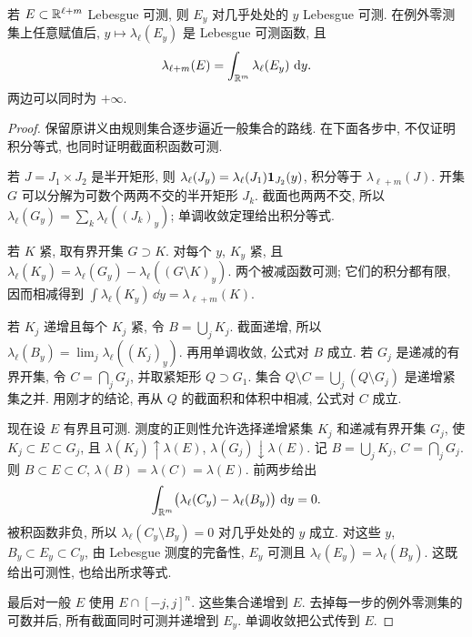 \begin{lemma}[集合的截面积公式]\label{ra:c6:cavalieri}
若 $E\subset\mathbb R^{\ell+m}$ Lebesgue 可测, 则 $E_y$ 对几乎处处的 $y$ Lebesgue 可测. 在例外零测集上任意赋值后, $y\mapsto\lambda_\ell(E_y)$ 是 Lebesgue 可测函数, 且
\[
 \lambda_{\ell+m}(E)=\int_{\mathbb R^m}\lambda_\ell(E_y)\,\,\mathrm d y.
\]
两边可以同时为 $+\infty$.
\end{lemma}
\begin{proof}
保留原讲义由规则集合逐步逼近一般集合的路线. 在下面各步中, 不仅证明积分等式, 也同时证明截面积函数可测.

若 $J=J_1\times J_2$ 是半开矩形, 则 $\lambda_\ell(J_y)=\lambda_\ell(J_1)\mathbf 1_{J_2}(y)$, 积分等于 $\lambda_{\ell+m}(J)$. 开集 $G$ 可以分解为可数个两两不交的半开矩形 $J_k$. 截面也两两不交, 所以 $\lambda_\ell(G_y)=\sum_k\lambda_\ell((J_k)_y)$; 单调收敛定理给出积分等式.

若 $K$ 紧, 取有界开集 $G\supset K$. 对每个 $y$, $K_y$ 紧, 且 $\lambda_\ell(K_y)=\lambda_\ell(G_y)-\lambda_\ell((G\setminus K)_y)$. 两个被减函数可测; 它们的积分都有限, 因而相减得到 $\int\lambda_\ell(K_y)\,\dd y=\lambda_{\ell+m}(K)$.

若 $K_j$ 递增且每个 $K_j$ 紧, 令 $B=\bigcup_jK_j$. 截面递增, 所以 $\lambda_\ell(B_y)=\lim_j\lambda_\ell((K_j)_y)$. 再用单调收敛, 公式对 $B$ 成立. 若 $G_j$ 是递减的有界开集, 令 $C=\bigcap_jG_j$, 并取紧矩形 $Q\supset G_1$. 集合 $Q\setminus C=\bigcup_j(Q\setminus G_j)$ 是递增紧集之并. 用刚才的结论, 再从 $Q$ 的截面积和体积中相减, 公式对 $C$ 成立.

现在设 $E$ 有界且可测. 测度的正则性允许选择递增紧集 $K_j$ 和递减有界开集 $G_j$, 使 $K_j\subset E\subset G_j$, 且 $\lambda(K_j)\uparrow\lambda(E)$, $\lambda(G_j)\downarrow\lambda(E)$. 记 $B=\bigcup_jK_j$, $C=\bigcap_jG_j$. 则 $B\subset E\subset C$, $\lambda(B)=\lambda(C)=\lambda(E)$. 前两步给出
\[
 \int_{\mathbb R^m}\bigl(\lambda_\ell(C_y)-\lambda_\ell(B_y)\bigr)\,\,\mathrm d y=0.
\]
被积函数非负, 所以 $\lambda_\ell(C_y\setminus B_y)=0$ 对几乎处处的 $y$ 成立. 对这些 $y$, $B_y\subset E_y\subset C_y$, 由 Lebesgue 测度的完备性, $E_y$ 可测且 $\lambda_\ell(E_y)=\lambda_\ell(B_y)$. 这既给出可测性, 也给出所求等式.

最后对一般 $E$ 使用 $E\cap[-j,j]^n$. 这些集合递增到 $E$. 去掉每一步的例外零测集的可数并后, 所有截面同时可测并递增到 $E_y$. 单调收敛把公式传到 $E$.
\end{proof}

